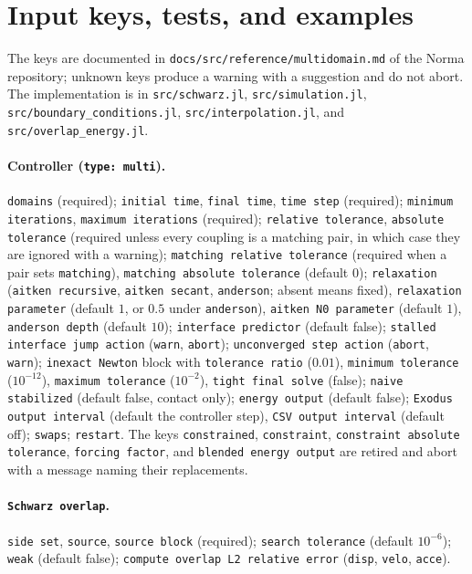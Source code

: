 \documentclass[11pt]{article}
\newcommand{\code}[1]{\texttt{#1}}
\begin{document}
\appendix

\section{Input keys, tests, and examples}
\label{app:keys}

The keys are documented in \code{docs/src/reference/multidomain.md} of the
Norma repository; unknown keys produce a warning with a suggestion and do
not abort. The implementation is in \code{src/schwarz.jl},
\code{src/simulation.jl}, \code{src/boundary\_conditions.jl},
\code{src/interpolation.jl}, and \code{src/overlap\_energy.jl}.

\paragraph{Controller (\code{type: multi}).} \code{domains} (required);
\code{initial time}, \code{final time}, \code{time step} (required);
\code{minimum iterations}, \code{maximum iterations} (required);
\code{relative tolerance}, \code{absolute tolerance} (required unless every
coupling is a matching pair, in which case they are ignored with a
warning); \code{matching relative tolerance} (required when a pair sets
\code{matching}), \code{matching absolute tolerance} (default $0$);
\code{relaxation} (\code{aitken recursive}, \code{aitken secant},
\code{anderson}; absent means fixed), \code{relaxation parameter} (default
$1$, or $0.5$ under \code{anderson}), \code{aitken N0 parameter} (default
$1$), \code{anderson depth} (default $10$); \code{interface predictor}
(default false); \code{stalled interface jump action} (\code{warn},
\code{abort}); \code{unconverged step action} (\code{abort}, \code{warn});
\code{inexact Newton} block with \code{tolerance ratio} ($0.01$),
\code{minimum tolerance} ($10^{-12}$), \code{maximum tolerance}
($10^{-2}$), \code{tight final solve} (false); \code{naive stabilized}
(default false, contact only); \code{energy output} (default
false); \code{Exodus output interval} (default the controller step),
\code{CSV output interval} (default off); \code{swaps}; \code{restart}.
The keys \code{constrained}, \code{constraint},
\code{constraint absolute tolerance}, \code{forcing factor}, and
\code{blended energy output} are retired and abort with a message naming
their replacements.

\paragraph{\code{Schwarz overlap}.} \code{side set}, \code{source},
\code{source block} (required); \code{search tolerance} (default
$10^{-6}$); \code{weak} (default false); \code{compute overlap L2 relative
error} (\code{disp}, \code{velo}, \code{acce}).
\end{document}
